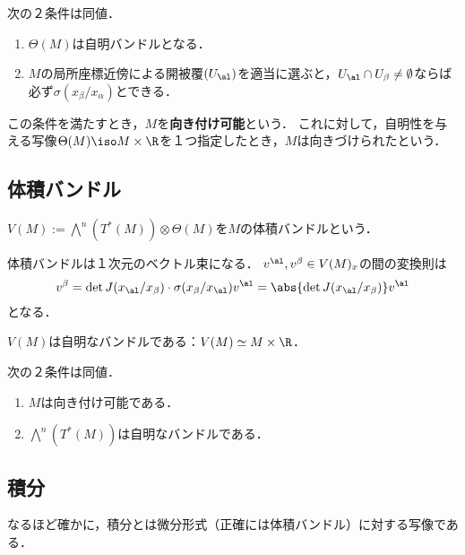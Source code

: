 \documentclass[uplatex,dvipdfmx]{jsreport}
\begin{document}
\begin{theorem}[orientation]
    次の２条件は同値．
    \begin{enumerate}
        \item $\Theta(M)$は自明バンドルとなる．
        \item $M$の局所座標近傍による開被覆$(U_\al)$を適当に選ぶと，$U_\al\cap U_\beta\ne\emptyset$ならば必ず$\sigma(x_\beta/x_\alpha)$とできる．
    \end{enumerate}
    この条件を満たすとき，$M$を\textbf{向き付け可能}という．
    これに対して，自明性を与える写像$\Theta(M)\iso M\times\R$を１つ指定したとき，$M$は向きづけられたという．
\end{theorem}

\subsection{体積バンドル}

\begin{definition}
    $V(M):=\bigwedge^n(T^*(M))\otimes\Theta(M)$を$M$の体積バンドルという．
\end{definition}
\begin{remarks}
    体積バンドルは１次元のベクトル束になる．
    $v^\al,v^\beta\in V(M)_x$の間の変換則は
    \[v^\beta=\det J(x_\al/x_\beta)\cdot\sigma(x_\beta/x_\al)v^\al=\abs{\det J(x_\al/x_\beta)}v^\al\]
    となる．
\end{remarks}

\begin{theorem}
    $V(M)$は自明なバンドルである：$V(M)\simeq M\times\R$．
\end{theorem}

\begin{corollary}
    次の２条件は同値．
    \begin{enumerate}
        \item $M$は向き付け可能である．
        \item $\bigwedge^n(T^*(M))$は自明なバンドルである．
    \end{enumerate}
\end{corollary}

\subsection{積分}

\begin{tcolorbox}[colframe=ForestGreen, colback=ForestGreen!10!white,breakable,colbacktitle=ForestGreen!40!white,coltitle=black,fonttitle=\bfseries\sffamily,
title=]
    なるほど確かに，積分とは微分形式（正確には体積バンドル）に対する写像である．
\end{tcolorbox}
\end{document}
